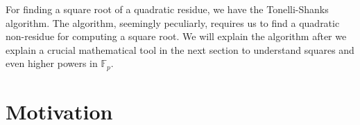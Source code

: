 \documentclass{report}
\newcommand{\ignore}[1]{}
\begin{document}
\ignore{ in a simple and accessible way to undergraduate sophomore; one way of determinsitically, reduced to finding a quadratic non-residue, a method of factorisation involves this problem 1: finding sqrt by finding quadratic non-residue: problem 2: finding qnr in polynomial function of intervals as required by a factoring algorithm by Shoup}
For finding a square root of a quadratic residue, we have the Tonelli-Shanks algorithm. The algorithm, seemingly peculiarly, requires us to find a quadratic non-residue for computing a square root\ignore{find probabilistically. The existing efficient algorithms for finding a quadratic non-residue are all probabilistic}. We will explain the algorithm after we explain a crucial mathematical tool in the next section to understand squares and even higher powers in $\mathbb{F}_p$.
%
\section{Motivation}
%

%
\end{document}
